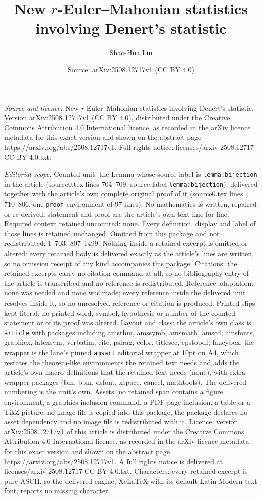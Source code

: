 \documentclass[10pt,a4paper]{amsart}
\title[New $r$-Euler--Mahonian statistics involving Denert's statis]{New $r$-Euler--Mahonian statistics involving Denert's statistic}
\author{Shao-Hua Liu}
\date{Source: arXiv:2508.12717v1 (CC BY 4.0)}
\begin{document}
\maketitle

\noindent\emph{Source and licence.} New $r$-Euler--Mahonian statistics involving Denert's statistic. Version arXiv:2508.12717v1 (CC BY 4.0), distributed under the Creative Commons Attribution 4.0 International licence, as recorded in the arXiv licence metadata for this exact version and shown on the abstract page https://arxiv.org/abs/2508.12717v1. Full rights notice: licenses/arxiv-2508.12717-CC-BY-4.0.txt.\par\smallskip

\noindent\textit{Editorial scope.} Counted unit: the Lemma whose source label is \texttt{lemma:bijection} in the article (source0.tex lines 704--709, source label \texttt{lemma:bijection}), delivered together with the article's own complete original proof of it (source0.tex lines 710--806, one \texttt{proof} environment of 97 lines). No mathematics is written, repaired or re-derived: statement and proof are the article's own text line for line. Required context retained uncounted: none. Every definition, display and label of those lines is retained unchanged. Omitted from this package and not redistributed: 1--703, 807--1499. Nothing inside a retained excerpt is omitted or altered: every retained body is delivered exactly as the article's lines are written, so no omission receipt of any kind accompanies this package. Citations: the retained excerpts carry no citation command at all, so no bibliography entry of the article is transcribed and no reference is redistributed. Reference adaptation: none was needed and none was made; every reference inside the delivered unit resolves inside it, so no unresolved reference or citation is produced. Printed slips kept literal: no printed word, symbol, hypothesis or number of the counted statement or of its proof was altered. Layout and class: the article's own class is \texttt{article} with packages including amsthm, amssymb, amsmath, amscd, amsfonts, graphicx, latexsym, verbatim, cite, psfrag, color, titlesec, epstopdf, fancybox; the wrapper is the lane's pinned \texttt{amsart} editorial wrapper at 10pt on A4, which restates the theorem-like environments the retained text needs and adds the article's own macro definitions that the retained text needs (none), with extra wrapper packages (bm, bbm, dsfont, xspace, cancel, mathtools). The delivered numbering is the unit's own. Assets: no retained span contains a figure environment, a graphics-inclusion command, a PDF-page inclusion, a table or a TikZ picture; no image file is copied into this package, the package declares no asset dependency and no image file is redistributed with it. Licence: version arXiv:2508.12717v1 of this article is distributed under the Creative Commons Attribution 4.0 International licence, as recorded in the arXiv licence metadata for this exact version and shown on the abstract page https://arxiv.org/abs/2508.12717v1. A full rights notice is delivered at licenses/arxiv-2508.12717-CC-BY-4.0.txt. Characters: every retained excerpt is pure ASCII, so the delivered engine, XeLaTeX with its default Latin Modern text font, reports no missing character.
\end{document}
